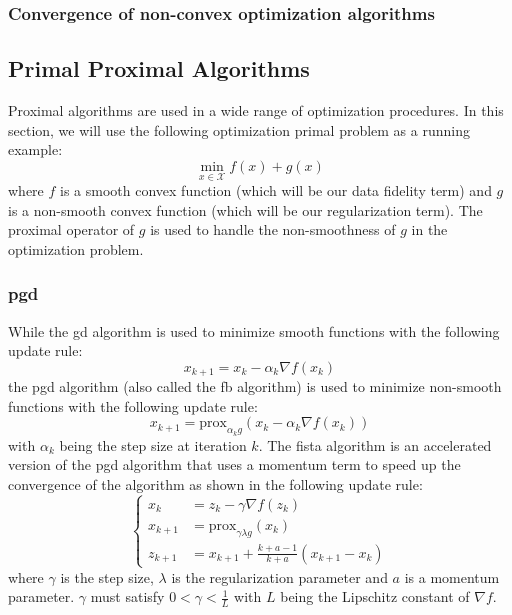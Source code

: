 \subsubsection{Convergence of non-convex optimization algorithms}




\subsection{Primal Proximal Algorithms}


Proximal algorithms are used in a wide range of optimization procedures. In this section, we will use the following optimization primal problem as a running example:
\begin{equation}
    \min_{x \in \mathcal{X}} f(x) + g(x)
    \label{eq:proximal_problem}
\end{equation}
where $f$ is a smooth convex function (which will be our data fidelity term) and $g$ is a non-smooth convex function (which will be our regularization term). The proximal operator of $g$ is used to handle the non-smoothness of $g$ in the optimization problem.

\subsubsection{\texorpdfstring{\acrfull{pgd}}{PGD}}

While the \acrshort{gd} algorithm is used to minimize smooth functions with the following update rule:
\begin{equation}
    x_{k+1} = x_k - \alpha_k \nabla f(x_k)
\end{equation}
the \acrshort{pgd} algorithm (also called the \acrfull{fb} algorithm) is used to minimize non-smooth functions with the following update rule:
\begin{equation}
    x_{k+1} = \text{prox}_{\alpha_k g}(x_k - \alpha_k \nabla f(x_k))
    \label{eq:pgd_update_rule}
\end{equation}
with $\alpha_k$ being the step size at iteration $k$.
The \acrfull{fista} algorithm \cite{Beck2009} is an accelerated version of the \acrshort{pgd} algorithm that uses a momentum term to speed up the convergence of the algorithm as shown in the following update rule:
\begin{equation}
    \begin{cases}
        x_k &= z_k - \gamma \nabla f(z_k) \\
        x_{k+1} &= \text{prox}_{\gamma \lambda g}(x_k) \\
        z_{k+1} &= x_{k+1} + \frac{k + a - 1}{k + a} (x_{k+1} - x_k)
    \end{cases}
\end{equation}
where $\gamma$ is the step size, $\lambda$ is the regularization parameter and $a$ is a momentum parameter. $\gamma$ must satisfy $0 < \gamma < \frac{1}{L}$ with $L$ being the Lipschitz constant of $\nabla f$.

